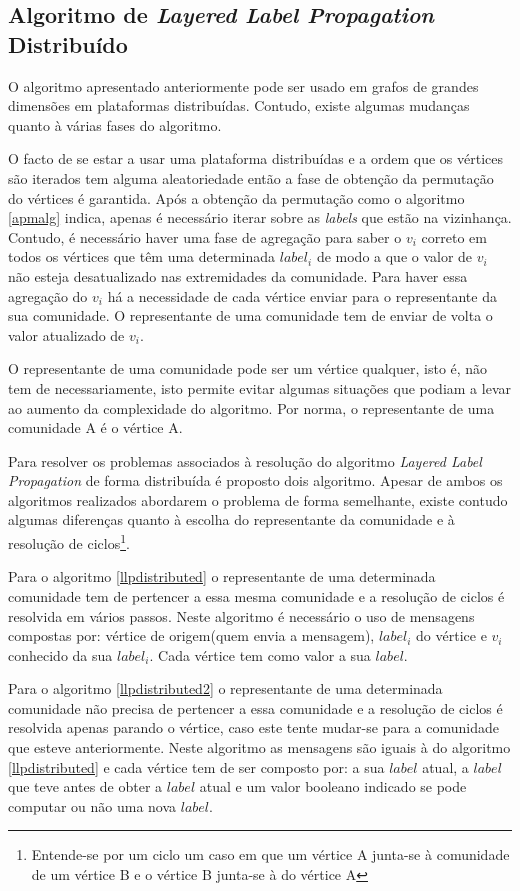 \subsection{Algoritmo de \textit{Layered Label Propagation} Distribuído}

O algoritmo apresentado anteriormente pode ser usado em grafos de grandes
dimensões em plataformas distribuídas. Contudo, existe algumas mudanças quanto 
à várias fases do algoritmo. 

  O facto de se estar a usar uma plataforma distribuídas e a ordem que os 
vértices são iterados tem alguma aleatoriedade então a fase de obtenção da 
permutação do vértices é garantida. Após a obtenção da permutação como o 
algoritmo \ref{apmalg} indica, apenas é necessário iterar sobre as 
\textit{labels} que estão na vizinhança. Contudo, é necessário haver uma fase 
de agregação para saber o $v_i$ correto em todos os vértices que têm uma 
determinada $label_i$ de modo a que o valor de $v_i$ não esteja desatualizado 
nas extremidades da comunidade. Para haver essa agregação do $v_i$ há a 
necessidade de cada vértice enviar para o representante da sua comunidade. O 
representante de uma comunidade tem de enviar de volta o valor atualizado de 
$v_i$.

O representante de uma comunidade pode ser um vértice qualquer, isto é, não 
tem de necessariamente, isto permite evitar algumas situações que 
podiam a levar ao aumento da complexidade do algoritmo. Por norma, o 
representante de uma comunidade A é o vértice A.

Para resolver os problemas associados à resolução do algoritmo \textit{Layered 
Label Propagation} de forma distribuída é proposto dois algoritmo. Apesar de 
ambos os algoritmos realizados abordarem o problema de forma semelhante, existe 
contudo algumas diferenças quanto à escolha do representante da comunidade e 
à resolução de ciclos\footnote{Entende-se por um ciclo um caso em que um 
vértice A junta-se à comunidade de um vértice B e o vértice B junta-se à do 
vértice A}.

Para o algoritmo \ref{llpdistributed} o representante de uma determinada 
comunidade tem de pertencer a essa mesma comunidade e a resolução de ciclos é 
resolvida em vários passos. Neste algoritmo é necessário o uso de mensagens 
compostas por: vértice de origem(quem envia a mensagem), $label_i$ do vértice e 
$v_i$ conhecido da sua $label_i$. Cada vértice tem como valor a sua $label$.

Para o algoritmo \ref{llpdistributed2} o representante de uma determinada 
comunidade não precisa de pertencer a essa comunidade e a resolução de ciclos é 
resolvida apenas parando o vértice, caso este tente mudar-se para a comunidade 
que esteve anteriormente. Neste algoritmo as mensagens são iguais à do 
algoritmo \ref{llpdistributed} e cada vértice tem de ser composto por: a sua 
$label$ atual, a $label$ que teve antes de obter a $label$ atual e um valor 
booleano indicado se pode computar ou não uma nova $label$.

